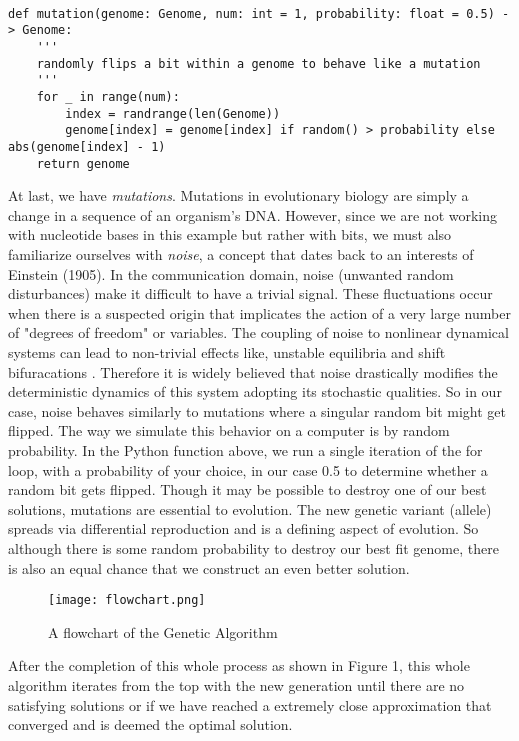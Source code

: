 \begin{lstlisting}

def mutation(genome: Genome, num: int = 1, probability: float = 0.5) -> Genome:
    '''
    randomly flips a bit within a genome to behave like a mutation
    '''
    for _ in range(num):
        index = randrange(len(Genome))
        genome[index] = genome[index] if random() > probability else abs(genome[index] - 1)
    return genome

\end{lstlisting} 

At last, we have \emph{mutations}. Mutations in evolutionary biology are simply a change in a sequence of an organism's DNA. However, since we are not working with nucleotide bases in this example but rather with bits, we must also familiarize ourselves with \emph{noise}, a concept that dates back to an interests of Einstein (1905). In the communication domain, noise (unwanted random disturbances) make it difficult to have a trivial signal. These fluctuations occur when there is a suspected origin that implicates the action of a very large number of "degrees of freedom" or variables. The coupling of noise to nonlinear dynamical systems can lead to non-trivial effects like, unstable equilibria and shift bifuracations \cite{Gammaitoni}. Therefore it is widely believed that noise drastically modifies the deterministic dynamics of this system adopting its stochastic qualities. So in our case, noise behaves similarly to mutations where a singular random bit might get flipped. The way we simulate this behavior on a computer is by random probability. In the Python function above, we run a single iteration of the for loop, with a probability of your choice, in our case 0.5 to determine whether a random bit gets flipped. Though it may be possible to destroy one of our best solutions, mutations are essential to evolution. The new genetic variant (allele) spreads via differential reproduction and is a defining aspect of evolution. So although there is some random probability to destroy our best fit genome, there is also an equal chance that we construct an even better solution. 

\begin{figure}[h]
\centering
\texttt{[image: flowchart.png]}
\caption{A flowchart of the Genetic Algorithm \cite{Gutierrez-Navaro}}
\end{figure}

After the completion of this whole process as shown in Figure 1, this whole algorithm iterates from the top with the new generation until there are no satisfying solutions or if we have reached a extremely close approximation that converged and is deemed the optimal solution.

